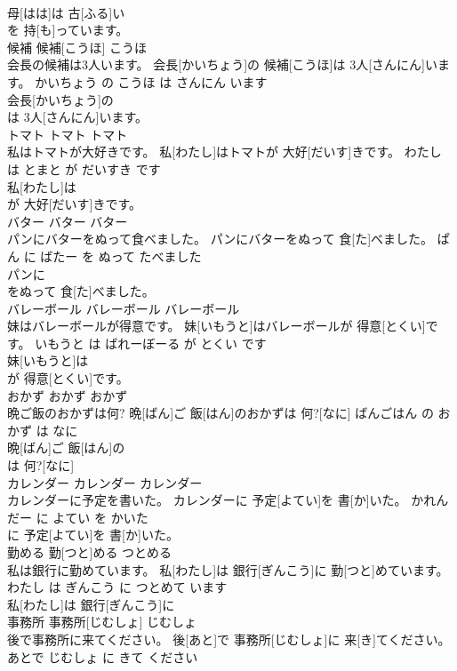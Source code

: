 \documentclass[8pt]{extreport}
\begin{document}
\begin{CJK}{UTF8}{min}
\\	母[はは]は 古[ふる]い
\\	を 持[も]っています。			
\\	候補	候補[こうほ]	こうほ	
\\	会長の候補は3人います。	会長[かいちょう]の 候補[こうほ]は 3人[さんにん]います。	かいちょう の こうほ は さんにん います	
\\	会長[かいちょう]の
\\	は 3人[さんにん]います。			
\\	トマト	トマト	トマト	
\\	私はトマトが大好きです。	私[わたし]はトマトが 大好[だいす]きです。	わたし は とまと が だいすき です	
\\	私[わたし]は
\\	が 大好[だいす]きです。			
\\	バター	バター	バター	
\\	パンにバターをぬって食べました。	パンにバターをぬって 食[た]べました。	ぱん に ばたー を ぬって たべました	
\\	パンに
\\	をぬって 食[た]べました。			
\\	バレーボール	バレーボール	バレーボール	
\\	妹はバレーボールが得意です。	妹[いもうと]はバレーボールが 得意[とくい]です。	いもうと は ばれーぼーる が とくい です	
\\	妹[いもうと]は
\\	が 得意[とくい]です。			
\\	おかず	おかず	おかず	
\\	晩ご飯のおかずは何?	晩[ばん]ご 飯[はん]のおかずは 何?[なに]	ばんごはん の おかず は なに	
\\	晩[ばん]ご 飯[はん]の
\\	は 何?[なに]			
\\	カレンダー	カレンダー	カレンダー	
\\	カレンダーに予定を書いた。	カレンダーに 予定[よてい]を 書[か]いた。	かれんだー に よてい を かいた	
\\	に 予定[よてい]を 書[か]いた。			
\\	勤める	勤[つと]める	つとめる	
\\	私は銀行に勤めています。	私[わたし]は 銀行[ぎんこう]に 勤[つと]めています。	わたし は ぎんこう に つとめて います	
\\	私[わたし]は 銀行[ぎんこう]に
\\	事務所	事務所[じむしょ]	じむしょ	
\\	後で事務所に来てください。	後[あと]で 事務所[じむしょ]に 来[き]てください。	あとで じむしょ に きて ください	

\end{CJK}
\end{document}
